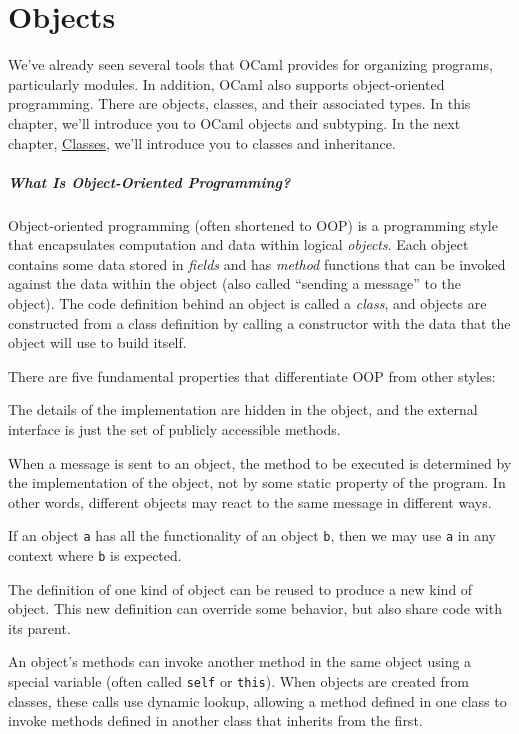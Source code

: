 \hypertarget{objects}{%
\section{Objects}\label{objects}}

We've already seen several tools that OCaml provides for organizing
programs, particularly modules. In addition, OCaml also supports
object-oriented programming. There are objects, classes, and their
associated types. In this chapter, we'll introduce you to OCaml objects
and subtyping. In the next chapter,
\href{classes.html\#classes}{Classes}, we'll introduce you to classes
and inheritance. 

\hypertarget{what-is-object-oriented-programming}{%
\subparagraph{What Is Object-Oriented
Programming?}\label{what-is-object-oriented-programming}}

Object-oriented programming (often shortened to OOP) is a programming
style that encapsulates computation and data within logical
\emph{objects}. Each object contains some data stored in \emph{fields}
and has \emph{method} functions that can be invoked against the data
within the object (also called ``sending a message'' to the object). The
code definition behind an object is called a \emph{class}, and objects
are constructed from a class definition by calling a constructor with
the data that the object will use to build itself.

There are five fundamental properties that differentiate OOP from other
styles:

\begin{description}
\tightlist
\item[Abstraction]
The details of the implementation are hidden in the object, and the
external interface is just the set of publicly accessible methods.
\item[Dynamic lookup]
When a message is sent to an object, the method to be executed is
determined by the implementation of the object, not by some static
property of the program. In other words, different objects may react to
the same message in different ways.
\item[Subtyping]
If an object \passthrough{\lstinline!a!} has all the functionality of an
object \passthrough{\lstinline!b!}, then we may use
\passthrough{\lstinline!a!} in any context where
\passthrough{\lstinline!b!} is expected.
\item[Inheritance]
The definition of one kind of object can be reused to produce a new kind
of object. This new definition can override some behavior, but also
share code with its parent.
\item[Open recursion]
An object's methods can invoke another method in the same object using a
special variable (often called \passthrough{\lstinline!self!} or
\passthrough{\lstinline!this!}). When objects are created from classes,
these calls use dynamic lookup, allowing a method defined in one class
to invoke methods defined in another class that inherits from the first.
\end{description}

